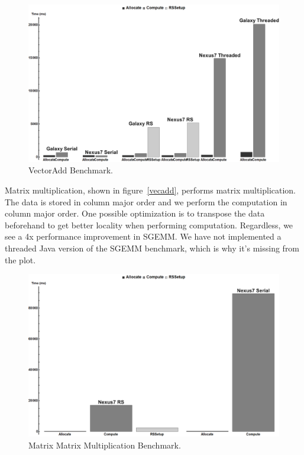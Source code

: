 \begin{figure}[t!]
\includegraphics[scale=0.125]{VectorAdd_nolog.png}
\caption{VectorAdd Benchmark.}
\label{fig:vecadd}
\centering
\end{figure}



Matrix multiplication, shown in figure~\ref{vecadd}, performs matrix multiplication.
The data is stored in column major order and we perform the computation in column major order.
One possible optimization is to transpose the data beforehand to get better locality when performing computation.
Regardless, we see a 4x performance improvement in SGEMM.
We have not implemented a threaded Java version of the SGEMM benchmark, which is why it's missing from
  the plot.
\begin{figure}[t!]
\includegraphics[scale=0.125]{Sgemm_nolog.png}
\caption{Matrix Matrix Multiplication Benchmark.}
\label{fig:sgemm}
\centering
\end{figure}


